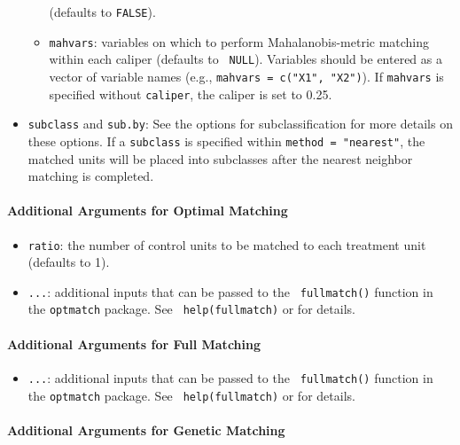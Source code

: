\begin{itemize}
\begin{itemize}
    (defaults to {\tt FALSE}).
  \item \texttt{mahvars}: variables on which to perform
    Mahalanobis-metric matching within each caliper (defaults to {\tt
      NULL}).  Variables should be entered as a vector of variable
    names (e.g., \texttt{mahvars = c("X1", "X2")}).  If
    \texttt{mahvars} is specified without \texttt{caliper}, the
    caliper is set to 0.25.
  \end{itemize}
\item \texttt{subclass} and \texttt{sub.by}: See the options for
  subclassification for more details on these options.  If a
  \texttt{subclass} is specified within \texttt{method = "nearest"},
  the matched units will be placed into subclasses after the nearest
  neighbor matching is completed.
\end{itemize}

\paragraph{Additional Arguments for Optimal Matching}
\label{subsubsec:inputs-optimal}

\begin{itemize}
\item {\tt ratio}: the number of control units to be matched to each
  treatment unit (defaults to 1).
\item {\tt ...}: additional inputs that can be passed to the {\tt
    fullmatch()} function in the {\tt optmatch} package. See {\tt
    help(fullmatch)} or
  for details.
\end{itemize}

\paragraph{Additional Arguments for Full Matching}
\label{subsubsec:inputs-full}

\begin{itemize}
\item {\tt ...}: additional inputs that can be passed to the {\tt
    fullmatch()} function in the {\tt optmatch} package. See {\tt
    help(fullmatch)} or
  for details.
\end{itemize}

\paragraph{Additional Arguments for Genetic Matching}
\label{subsubsec:inputs-genetic}

